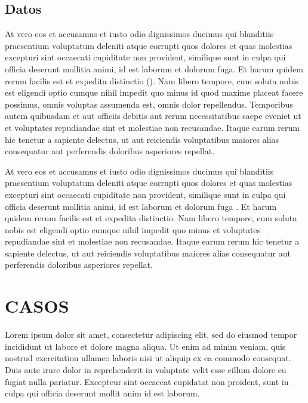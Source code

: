 \documentclass[12pt]{article} %
\begin{document}
\subsection*{Datos} 
At vero eos et accusamus et iusto odio dignissimos ducimus qui blanditiis praesentium voluptatum deleniti atque corrupti quos dolores et quas molestias excepturi sint occaecati cupiditate non provident, similique sunt in culpa qui officia deserunt mollitia animi, id est laborum et dolorum fuga. Et harum quidem rerum facilis est et expedita distinctio (\citealp{dunning_design-based_2010,brady_rethinking_2010,calvo_ballot_2009}). Nam libero tempore, cum soluta nobis est eligendi optio cumque nihil impedit quo minus id quod maxime placeat facere possimus, omnis voluptas assumenda est, omnis dolor repellendus. Temporibus autem quibusdam et aut officiis debitis aut rerum necessitatibus saepe eveniet ut et voluptates repudiandae sint et molestiae non recusandae. Itaque earum rerum hic tenetur a sapiente delectus, ut aut reiciendis voluptatibus maiores alias consequatur aut perferendis doloribus asperiores repellat.

At vero eos et accusamus et iusto odio dignissimos ducimus qui blanditiis praesentium voluptatum deleniti atque corrupti quos dolores et quas molestias excepturi sint occaecati cupiditate non provident, similique sunt in culpa qui officia deserunt mollitia animi, id est laborum et dolorum fuga \citet{}. Et harum quidem rerum facilis est et expedita distinctio. Nam libero tempore, cum soluta nobis est eligendi optio cumque nihil impedit quo minus et voluptates repudiandae sint et molestiae non recusandae. Itaque earum rerum hic tenetur a sapiente delectus, ut aut reiciendis voluptatibus maiores alias consequatur aut perferendis doloribus asperiores repellat.



\section{CASOS}

Lorem ipsum dolor sit amet, consectetur adipiscing elit, sed do eiusmod tempor incididunt ut labore et dolore magna aliqua. Ut enim ad minim veniam, quis nostrud exercitation ullamco laboris nisi ut aliquip ex ea commodo consequat. Duis aute irure dolor in reprehenderit in voluptate velit esse cillum dolore eu fugiat nulla pariatur. Excepteur sint occaecat cupidatat non proident, sunt in culpa qui officia deserunt mollit anim id est laborum.
\end{document}
